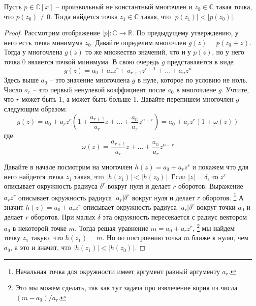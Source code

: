 \begin{claim}
Пусть $p\in\mathbb C[x]$ -- произвольный не константный многочлен и $z_0\in \mathbb C$ такая точка, что $p(z_0)\neq 0$.
Тогда найдется точка $z_1\in \mathbb C$ такая, что $|p(z_1)|<|p(z_0)|$.
\end{claim}
\begin{proof}
Рассмотрим отображение $|p|\colon \mathbb C\to \mathbb R$.
По предыдущему утверждению, у него есть точка минимума $z_0$.
Давайте определим многочлен $g(z) = p(z_0 + z)$.
Тогда у многочлена $g(z)$ то же множество значений, что и у $p(z)$, но у него точка $0$ является точкой минимума.
В свою очередь $g$ представляется в виде
\[
g(z) = a_0 + a_r z^r + a_{r+1}z^{r+1} + \ldots + a_n z^n
\]
Здесь выше $a_0$ -- это значение многочлена $g$ в нуле, которое по условию не ноль.
Число $a_r$ -- это первый ненулевой коэффициент после $a_0$ в многочлене $g$.
Учтите, что $r$ может быть $1$, а может быть больше $1$.
Давайте перепишем многочлен $g$ следующим образом:
\[
g(z) = a_0 + a_r z^r\left(1 + \frac{a_{r+1}}{a_r}z + \ldots + \frac{a_n}{a_r} z^{n-r}\right) = a_0 + a_r z^r\left(1 + \omega(z) \right)
\]
где
\[
\omega(z) =  \frac{a_{r+1}}{a_r}z + \ldots + \frac{a_n}{a_r} z^{n-r}
\]

Давайте в начале посмотрим на многочлен $h(z) = a_0 + a_r z^r$ и покажем что для  него найдется точка $z_1$ такая, что $|h(z_1)| < |h(z_0)|$.
Если $|z| = \delta$, то $z^r$ описывает окружность радиуса $\delta^r$ вокруг нуля и делает $r$ оборотов.
Выражение $a_r z^r$ описывает окружность радиуса $|a_r|\delta^r$ вокруг нуля и делает $r$ оборотов.%
\footnote{Начальная точка для окружности имеет аргумент равный аргументу $a_r$.}
А значит $h(z) = a_0 + a_r z^r$ описывает окружность радиуса $|a_r|\delta^r$ вокруг точки $a_0$ и делает $r$ оборотов.
При малых $\delta$ эта окружность пересекается с радиус вектором $a_0$ в некоторой точке $m$.
Тогда решая уравнение $m = a_0 + a_r z^r$,%
\footnote{Это мы можем сделать, так как тут задача про извлечение корня из числа $(m - a_0) / a_r$.}
мы найдем точку $z_1$ такую, что $h(z_1) = m$.
Но по построению точка $m$ ближе к нулю, чем $a_0$, а это и значит, что $|h(z_1)| < |h(z_0)|$.


\end{proof}
